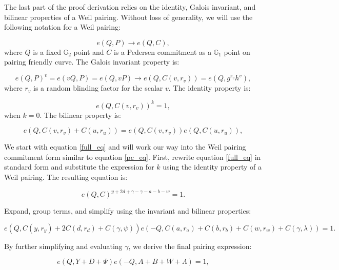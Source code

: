 \documentclass{iacrcc}
\theoremstyle{definition}
\begin{document}
The last part of the proof derivation relies on the identity, Galois invariant, and bilinear properties of a Weil pairing. Without loss of generality, we will use the following notation for a Weil pairing:

\begin{equation}
e(Q, P) \rightarrow e(Q, C),
\end{equation}
where \( Q \) is a fixed \( \mathbb{G}_{2} \) point and \(C\) is a Pedersen commitment as a \( \mathbb{G}_{1} \) point on pairing friendly curve. The Galois invariant property is:

\begin{equation}
e(Q, P)^v = e(v Q, P) = e(Q, v P) \rightarrow e(Q, C(v, r_{v})) = e(Q, g^{r_{v}} h^{v}),
\end{equation}
where $r_{v}$ is a random blinding factor for the scalar $v$. The identity property is:

\begin{equation}
e(Q, C(v, r_{v}))^{k} = 1,
\end{equation}
when \( k = 0 \). The bilinear property is:

\begin{equation}
e(Q, C(v, r_{v}) + C(u, r_{u})) = e(Q, C(v, r_{v}))e(Q, C(u, r_{u})),
\end{equation}

We start with equation \ref{full_eq} and will work our way into the Weil pairing commitment form similar to equation \ref{pc_eq}. First, rewrite equation \ref{full_eq} in standard form and substitute the expression for \( k \) using the identity property of a Weil pairing. The resulting equation is:

\begin{equation}
e(Q, C)^{y + 2d + \gamma - \gamma - a - b - w} = 1.
\end{equation}

Expand, group terms, and simplify using the invariant and bilinear properties:

\begin{equation}
e(Q, C(y, r_{y}) + 2 C(d, r_{d}) + C(\gamma, \psi))e(-Q, C(a, r_{a}) + C(b, r_{b}) + C(w, r_{w}) + C(\gamma, \lambda)) = 1.
\end{equation}

By further simplifying and evaluating \( \gamma \), we derive the final pairing expression:

\begin{equation}
e(Q, Y + D + \Psi)e(-Q, A + B + W + \Lambda) = 1,
\end{equation}
\end{document}
